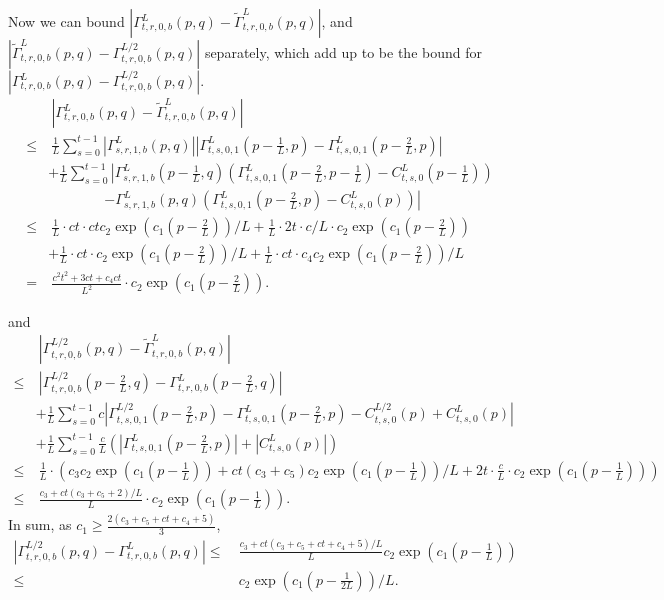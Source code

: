 Now we can bound $|\Gamma^L_{t,r,0,b}\left(p, q\right)-\tilde\Gamma^L_{t,r,0,b}\left(p, q\right)|$, and $|\tilde\Gamma^L_{t,r,0,b}\left(p, q\right)-\Gamma^{L/2}_{t,r,0,b}\left(p, q\right)|$ separately, which add up to be the bound for $|\Gamma^L_{t,r,0,b}\left(p, q\right)-\Gamma^{L/2}_{t,r,0,b}\left(p, q\right)|$.
\begin{align*} 
    &~ |\Gamma^L_{t,r,0,b}\left(p, q\right)-\tilde\Gamma^L_{t,r,0,b}\left(p, q\right)| \\
    \leq  &~\frac1L \sum_{s=0}^{t-1} |\Gamma^L_{s,r,1,b}\left(p, q\right)|\left|\Gamma^L_{t,s,0,1}\left(p-\frac1L, p\right)-\Gamma^L_{t,s,0,1}\left(p-\frac2L, p\right)\right|  \\
    & + \frac1L \sum_{s=0}^{t-1} \left|\Gamma^L_{s,r,1,b}\left(p-\frac1L, q\right)\left(\Gamma^L_{t,s,0,1}\left(p-\frac2L, p-\frac1L\right)-C^L_{t,s,0}\left(p-\frac1L\right)\right)\right.\\
    & \qquad\qquad \left.- \Gamma^L_{s,r,1,b}\left(p, q\right)\left(\Gamma^L_{t,s,0,1}\left(p-\frac2L, p\right)-C^L_{t,s,0}\left(p\right)\right)\right|\\
    \leq &~ \frac 1L \cdot  ct\cdot ctc_2\exp(c_1(p-\frac2L)) / L + \frac1L \cdot 2t\cdot c / L \cdot c_2\exp(c_1(p-\frac2L)) \\
    & + \frac1L \cdot ct \cdot c_2\exp(c_1(p-\frac2L)) / L + \frac1L \cdot ct \cdot c_4 c_2\exp(c_1(p-\frac2L))/L\\
    = &~ \frac{c^2t^2+3ct+c_4ct}{L^2}
    \cdot c_2\exp(c_1(p-\frac2L)).
\end{align*}

and
\begin{align*} 
     &~ |\Gamma_{t,r,0,b}^{L/2}\left(p, q\right) - \tilde\Gamma_{t,r,0,b}^{L}\left(p, q\right)| \\
     \leq  &~|\Gamma_{t,r,0,b}^{L/2}\left(p-\frac2L, q\right) - \Gamma_{t,r,0,b}^L\left(p-\frac2L, q\right)|  \\
     & + \frac1L \sum_{s=0}^{t-1} c\left|\Gamma_{t,s,0,1}^{L/2}\left(p-\frac2L, p\right) - \Gamma_{t,s,0,1}^L\left(p-\frac2L, p\right)-C_{t,s,0}^{L/2}\left(p\right)+C_{t,s,0}^L\left(p\right)\right|\\
     & + \frac1L \sum_{s=0}^{t-1} \frac cL\left(|\Gamma^L_{t,s,0,1}\left(p-\frac2L, p\right)|+|C^L_{t,s,0}\left(p\right)|\right) \\
     \leq &~ \frac 1L \cdot (c_3c_2 \exp(c_1(p-\frac1L)) +   ct (c_3+c_5) c_2 \exp(c_1(p-\frac1L)) / L + 2t \cdot \frac cL \cdot  c_2 \exp(c_1(p-\frac1L)) )\\
     \leq &~ \frac {c_3+ct(c_3+c_5+2)/L}L \cdot c_2 \exp(c_1(p-\frac1L)).
\end{align*}
In sum, as $c_1\geq \frac{2(c_3+c_5+ct+c_4+5)}3$,
\begin{align*}
    |\Gamma_{t,r,0,b}^{L/2}\left(p, q\right) - \Gamma_{t,r,0,b}^{L}\left(p, q\right)|\leq &~ \frac{c_3+ct(c_3+c_5+ct+c_4+5)/L}{L} c_2 \exp(c_1(p-\frac1L))\\
    \leq &~ c_2 \exp(c_1(p-\frac1{2L})) /L.
\end{align*} 

